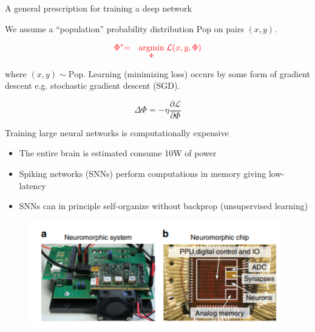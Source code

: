 \documentclass[aspectratio=169]{beamer}
\begin{document}
\begin{frame}{A general prescription for training a deep network}

We assume a ``population'' probability distribution $\mathrm{Pop}$ on pairs $(x,y)$.

\vfill
\begin{eqnarray*}
{\color{red} \Phi^*} & {\color{red}  =} & {\color{red} \underset{\Phi}{\mathrm{argmin}} \;{\mathcal L}(x,y,\Phi)}
\end{eqnarray*}

\vfill
where $(x,y)\sim \mathrm{Pop}$. Learning (minimizing loss) occurs by some form of gradient descent e.g. stochastic gradient descent (SGD).

\begin{equation*}
\Delta \Phi = -\eta\frac{\partial \mathcal{L}}{\partial \Phi}
\end{equation*}

\end{frame}


\begin{frame}{Training large neural networks is computationally expensive}

\begin{itemize}
\item The entire brain is estimated consume 10W of power
\item Spiking networks (SNNs) perform computations in memory giving low-latency
\item SNNs can in principle self-organize without backprop (unsupervised learning)
\end{itemize}

\begin{figure}
\includegraphics[width=110mm]{hardware-figure}
\end{figure}

\end{frame}
\end{document}
